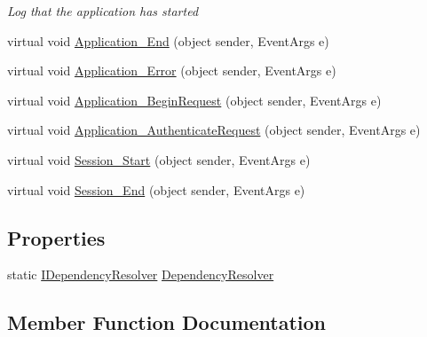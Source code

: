 \begin{DoxyCompactItemize}
\begin{DoxyCompactList}\small\item\em Log that the application has started \end{DoxyCompactList}\item 
virtual void \hyperlink{classCqrs_1_1WebApi_1_1CqrsHttpApplication_a3402481d96af628677e4b45c85eb889e_a3402481d96af628677e4b45c85eb889e}{Application\+\_\+\+End} (object sender, Event\+Args e)
\item 
virtual void \hyperlink{classCqrs_1_1WebApi_1_1CqrsHttpApplication_aa7d796b928c48da0505432ffb4088c5f_aa7d796b928c48da0505432ffb4088c5f}{Application\+\_\+\+Error} (object sender, Event\+Args e)
\item 
virtual void \hyperlink{classCqrs_1_1WebApi_1_1CqrsHttpApplication_aa5df227fdef4605d0bbd353066f2b3f1_aa5df227fdef4605d0bbd353066f2b3f1}{Application\+\_\+\+Begin\+Request} (object sender, Event\+Args e)
\item 
virtual void \hyperlink{classCqrs_1_1WebApi_1_1CqrsHttpApplication_aa8f9a572804c8c686c2381029c20c303_aa8f9a572804c8c686c2381029c20c303}{Application\+\_\+\+Authenticate\+Request} (object sender, Event\+Args e)
\item 
virtual void \hyperlink{classCqrs_1_1WebApi_1_1CqrsHttpApplication_a51f539501f607c3ecae6530120c129eb_a51f539501f607c3ecae6530120c129eb}{Session\+\_\+\+Start} (object sender, Event\+Args e)
\item 
virtual void \hyperlink{classCqrs_1_1WebApi_1_1CqrsHttpApplication_a72e04b9b77ef87292801f8b65edace1e_a72e04b9b77ef87292801f8b65edace1e}{Session\+\_\+\+End} (object sender, Event\+Args e)
\end{DoxyCompactItemize}
\subsection*{Properties}
\begin{DoxyCompactItemize}
\item 
static \hyperlink{interfaceCqrs_1_1Configuration_1_1IDependencyResolver}{I\+Dependency\+Resolver} \hyperlink{classCqrs_1_1WebApi_1_1CqrsHttpApplication_a9d6bd681b84a94ae58abdb0b5cf2cbfd_a9d6bd681b84a94ae58abdb0b5cf2cbfd}{Dependency\+Resolver}
\end{DoxyCompactItemize}


\subsection{Member Function Documentation}
\mbox{\label{classCqrs_1_1WebApi_1_1CqrsHttpApplication_aa8f9a572804c8c686c2381029c20c303_aa8f9a572804c8c686c2381029c20c303}} 
